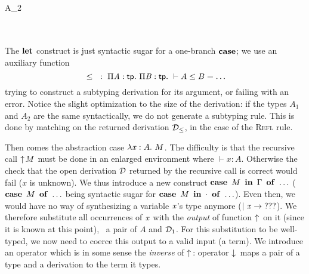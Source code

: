 \documentclass{llncs}
\begin{document}
\begin{mathleft}
  \quad{} \\
  \quad\quad{} {}
   {}
   { {A_2}} \\
  \quad\quad
  \match{\md_{\leq}} \\
  \quad\quad\quad{}
   {} \\
  \quad\quad\quad\caseb{\_}
   {}
\end{mathleft}

\noindent
The $\operatorname{\bf let}$ construct is just syntactic sugar for a one-branch
$\operatorname{\bf case}$; we use an auxiliary function $${}\leq{}\ :\ \Pi{\ensuremath{\text{\textit{A}}}}:{\text{\textsf{tp}}}.\  \Pi{\ensuremath{\text{\textit{B}}}}:{\text{\textsf{tp}}}.\  \vdash A\leq B = \ldots$$ trying to
construct a subtyping derivation for its argument, or failing with an
error. Notice the slight optimization to the size of the derivation:
if the types $A_1$ and $A_2$ are the same syntactically, we do not
generate a subtyping rule. This is done by matching on the returned
derivation $\mathcal D_\leq$, in the case of the \textsc{Refl} rule.

Then comes the abstraction case $\lambda{\ensuremath{\text{\textit{x}}}}:{A}.\  M$. The difficulty is that
the recursive call $\uparrow\!{M}$ must be done in an enlarged
environment where $\vdash x : A$. Otherwise the check that the open
derivation $\mathcal D$ returned by the recursive call is correct would fail
($x$ is unknown). We thus introduce a new construct $\operatorname{\bf case}\ {{M}\ \operatorname{\bf in}\ {\Gamma}}\ \operatorname{\bf of}\ 
\ldots$ ($\operatorname{\bf case}\ {M}\ \operatorname{\bf of}\  \ldots$ being syntactic sugar for $\operatorname{\bf case}\ {{M}\ \operatorname{\bf in}\ {\cdot}}\ \operatorname{\bf of}\  \ldots$). Even then, we would have no way of synthesizing a
variable $\text{\textit{x}}$'s type anymore ($|\ {\text{\textit{x}}}\to \text{???}$). We
therefore substitute all occurrences of $\text{\textit{x}}$ with the
\emph{output} of function $\uparrow\!{}$ on it (since it is known at this
point), \ie\ a pair of $A$ and $\mathcal D_1$. For this substitution to be
well-typed, we now need to coerce this output to a valid input (a
term). We introduce an operator which is in some sense the
\emph{inverse} of $\uparrow\!{}$: operator $\downarrow\!{}$ maps a pair of a
type and a derivation to the term it types.

\begin{mathleft}
  \quad{}
  {}
\end{mathleft}
\end{document}
